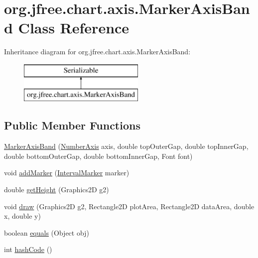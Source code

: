 \hypertarget{classorg_1_1jfree_1_1chart_1_1axis_1_1_marker_axis_band}{}\section{org.\+jfree.\+chart.\+axis.\+Marker\+Axis\+Band Class Reference}
\label{classorg_1_1jfree_1_1chart_1_1axis_1_1_marker_axis_band}
Inheritance diagram for org.\+jfree.\+chart.\+axis.\+Marker\+Axis\+Band\+:\begin{figure}[H]
\begin{center}
\leavevmode
\includegraphics[height=2.000000cm]{classorg_1_1jfree_1_1chart_1_1axis_1_1_marker_axis_band}
\end{center}
\end{figure}
\subsection*{Public Member Functions}
\begin{DoxyCompactItemize}
\item 
\mbox{\hyperlink{classorg_1_1jfree_1_1chart_1_1axis_1_1_marker_axis_band_a83f68919e175e43c81c657a251caba78}{Marker\+Axis\+Band}} (\mbox{\hyperlink{classorg_1_1jfree_1_1chart_1_1axis_1_1_number_axis}{Number\+Axis}} axis, double top\+Outer\+Gap, double top\+Inner\+Gap, double bottom\+Outer\+Gap, double bottom\+Inner\+Gap, Font font)
\item 
void \mbox{\hyperlink{classorg_1_1jfree_1_1chart_1_1axis_1_1_marker_axis_band_a5a608c3a4930980ca45d53487947259e}{add\+Marker}} (\mbox{\hyperlink{classorg_1_1jfree_1_1chart_1_1plot_1_1_interval_marker}{Interval\+Marker}} marker)
\item 
double \mbox{\hyperlink{classorg_1_1jfree_1_1chart_1_1axis_1_1_marker_axis_band_a1dc9755dee1737e45107a9234c57aa79}{get\+Height}} (Graphics2D g2)
\item 
void \mbox{\hyperlink{classorg_1_1jfree_1_1chart_1_1axis_1_1_marker_axis_band_aef22218740d425740beef81c4c370964}{draw}} (Graphics2D g2, Rectangle2D plot\+Area, Rectangle2D data\+Area, double x, double y)
\item 
boolean \mbox{\hyperlink{classorg_1_1jfree_1_1chart_1_1axis_1_1_marker_axis_band_a6dfdfc54f5ee21f9bd2f60fcfbe2c0bf}{equals}} (Object obj)
\item 
int \mbox{\hyperlink{classorg_1_1jfree_1_1chart_1_1axis_1_1_marker_axis_band_a476caf21452b906c946f5b9f0501e6fa}{hash\+Code}} ()
\end{DoxyCompactItemize}


